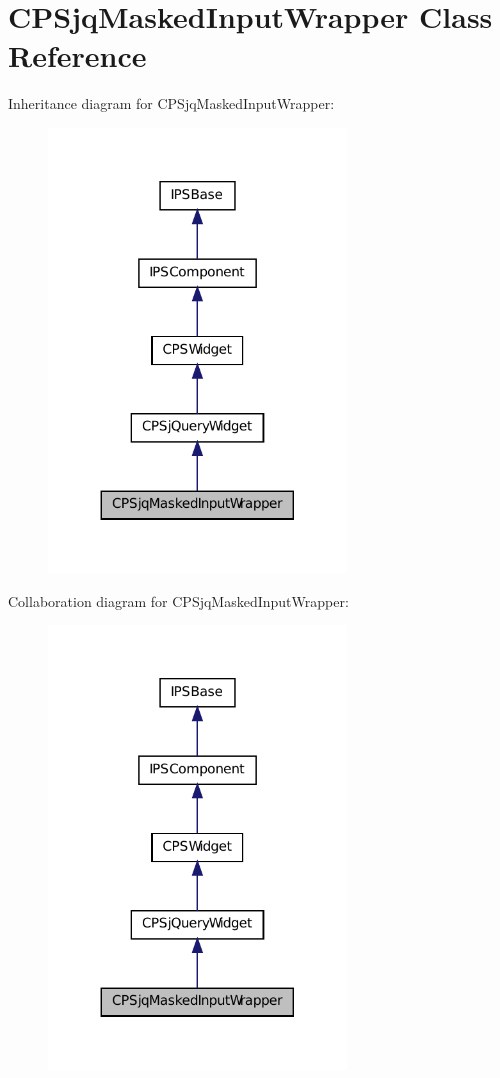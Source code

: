 \hypertarget{classCPSjqMaskedInputWrapper}{
\section{CPSjqMaskedInputWrapper Class Reference}
\label{classCPSjqMaskedInputWrapper}
}


Inheritance diagram for CPSjqMaskedInputWrapper:\nopagebreak
\begin{figure}[H]
\begin{center}
\leavevmode
\includegraphics[width=224pt]{classCPSjqMaskedInputWrapper__inherit__graph}
\end{center}
\end{figure}


Collaboration diagram for CPSjqMaskedInputWrapper:\nopagebreak
\begin{figure}[H]
\begin{center}
\leavevmode
\includegraphics[width=224pt]{classCPSjqMaskedInputWrapper__coll__graph}
\end{center}
\end{figure}
